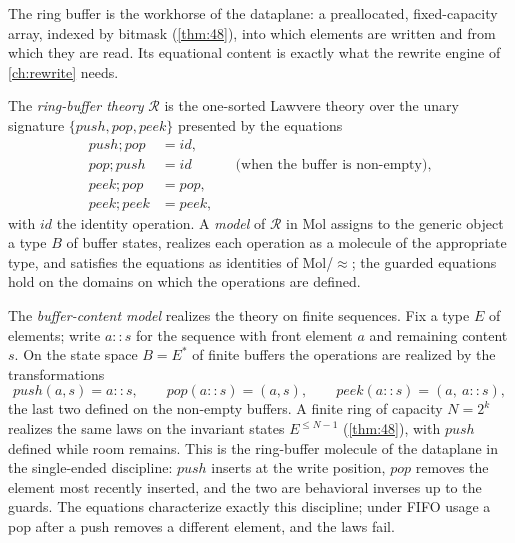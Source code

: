 The ring buffer is the workhorse of the dataplane: a preallocated,
fixed-capacity array, indexed by bitmask (\autoref{thm:48}), into which
elements are written and from which they are read. Its equational content
is exactly what the rewrite engine of \autoref{ch:rewrite} needs.

\begin{definition}
\label{def:ring-theory}
The \emph{ring-buffer theory} $\mathcal{R}$ is the one-sorted Lawvere theory
over the unary signature $\{\mathit{push}, \mathit{pop}, \mathit{peek}\}$
presented by the equations
\begin{align}
\mathit{push};\mathit{pop} &= \mathit{id}, \label{eq:r1}\\
\mathit{pop};\mathit{push} &= \mathit{id} &&\text{(when the buffer is
non-empty)}, \label{eq:r2}\\
\mathit{peek};\mathit{pop} &= \mathit{pop}, \label{eq:r3}\\
\mathit{peek};\mathit{peek} &= \mathit{peek}, \label{eq:r4}
\end{align}
with $\mathit{id}$ the identity operation. A \emph{model} of $\mathcal{R}$
in Mol assigns to the generic object a type $B$ of buffer states, realizes
each operation as a molecule of the appropriate type, and satisfies the
equations as identities of Mol/$\approx$; the guarded equations hold on the
domains on which the operations are defined.
\end{definition}

The \emph{buffer-content model} realizes the theory on finite sequences.
Fix a type $E$ of elements; write $a \mathbin{::} s$ for the sequence with
front element $a$ and remaining content $s$. On the state space
$B = E^{*}$ of finite buffers the operations are realized by the
transformations
\[
\mathit{push} (a,s) = a \mathbin{::} s, \qquad
\mathit{pop} (a \mathbin{::} s) = (a,s), \qquad
\mathit{peek} (a \mathbin{::} s) = (a,\ a \mathbin{::} s),
\]
the last two defined on the non-empty buffers. A finite ring of capacity
$N = 2^{k}$ realizes the same laws on the invariant states $E^{\leq N-1}$
(\autoref{thm:48}), with $\mathit{push}$ defined while room remains. This is
the ring-buffer molecule of the dataplane in the single-ended discipline:
$\mathit{push}$ inserts at the write position, $\mathit{pop}$ removes the
element most recently inserted, and the two are behavioral inverses up to
the guards. The equations characterize exactly this discipline; under FIFO
usage a pop after a push removes a different element, and the laws fail.


